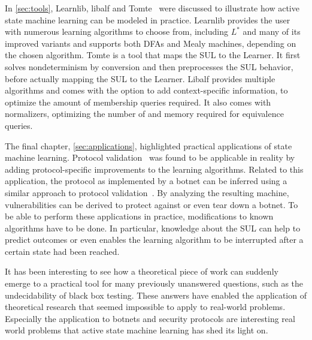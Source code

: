 In \cref{sec:tools}, Learnlib, libalf and Tomte~\cite{Raffelt2009,Bollig2010,Tomte2014}
were discussed to illustrate how active state machine learning can be modeled in
practice. Learnlib provides the user with numerous learning algorithms to choose
from, including $L^*$ and many of its improved variants and supports both DFAs
and Mealy machines, depending on the chosen algorithm. Tomte is a tool that maps
the SUL to the Learner. It first solves nondeterminism by conversion and then
preprocesses the SUL behavior, before actually mapping the SUL to the Learner.
Libalf provides multiple algorithms and comes with the option to add
context-specific information, to optimize the amount of membership queries
required. It also comes with normalizers, optimizing the number of and memory
required for equivalence queries.

The final chapter, \cref{sec:applications}, highlighted practical applications of state
machine learning. Protocol validation~\cite{deRuiter2015} was found to be
applicable in reality by adding protocol-specific improvements to the
learning algorithms. Related to this application, the protocol as implemented
by a botnet can be inferred using a similar approach to protocol
validation~\cite{Cho2010}. By analyzing the resulting machine, vulnerabilities
can be derived to protect against or even tear down a botnet.
To be able to perform these applications in practice, modifications to known
algorithms have to be done. In particular, knowledge about the SUL can help to
predict outcomes or even enables the learning algorithm to be interrupted after
a certain state had been reached.

It has been interesting to see how a theoretical piece of work can suddenly
emerge to a practical tool for many previously unanswered questions, such as the
undecidability of black box testing. These answers have enabled the
application of theoretical research that seemed impossible to apply to real-world
problems. Especially the application to botnets and security protocols are
interesting real world problems that active state machine learning has shed its
light on.

